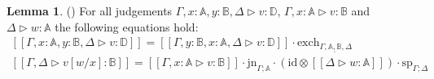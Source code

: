 \documentclass[10pt,a4paper]{amsart}
\theoremstyle{definition}
\theoremstyle{definition}
\theoremstyle{definition}
\newtheorem{lemma}[definition]{Lemma}
\theoremstyle{definition}
\theoremstyle{definition}
\theoremstyle{definition}
\begin{document}
\begin{lemma} \label{interpret_exch} () For all judgements $\Gamma,x:\mathbb{A}, y:\mathbb{B}, \Delta \triangleright v: \mathbb{D}$, $\Gamma,x:\mathbb{A} \triangleright v: \mathbb{B}$ and $\Delta \triangleright w: \mathbb{A}$  the following equations hold: 
  \begin{equation*}
\begin{split}
  [\![\Gamma,x:\mathbb{A}, y:\mathbb{B}, \Delta \triangleright v: \mathbb{D}]\!] = [\![\Gamma,y:\mathbb{B},x:\mathbb{A},  \Delta \triangleright v: \mathbb{D}]\! ] \cdot \text{exch}_{\Gamma, \underline{ \mathbb{A}, \mathbb{B}} ,\Delta} \\
  [\![\Gamma, \Delta \triangleright v[w/x]: \mathbb{B}]\!] = [\![\Gamma, x:\mathbb{A} \triangleright v: \mathbb{B}]\!]\cdot \text{jn}_{\Gamma;\mathbb{A}} \cdot (\text{id} \otimes [\![ \Delta  \triangleright w: \mathbb{A}]\!] ) \cdot \text{sp}_{\Gamma;\Delta} 
\end{split}
  \end{equation*}
\end{lemma}
\end{document}
